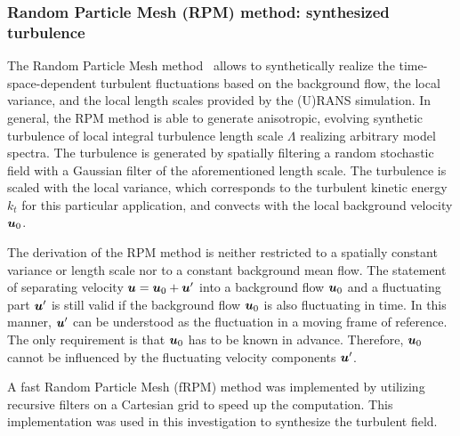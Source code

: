 \subsubsection{Random Particle Mesh (RPM) method: synthesized turbulence}
The Random Particle Mesh method~\cite{ewert_caa_2011} allows to synthetically realize the time-space-dependent turbulent fluctuations based on the background flow, the local variance, and the local length scales provided by the (U)RANS simulation. In general, the RPM method is able to generate anisotropic, evolving synthetic turbulence of local integral turbulence length scale $\Lambda$ 
realizing arbitrary model spectra. The turbulence is generated by spatially filtering a random stochastic field with a Gaussian filter of the aforementioned length scale. The turbulence is scaled with the local variance, which corresponds to the turbulent kinetic energy $k_t$ for this particular application, and convects with the local background velocity ${\boldsymbol{u}}_0$.

The derivation of the RPM method is neither restricted to a spatially constant variance or length scale nor to a constant background mean flow. The statement of separating velocity ${\boldsymbol{u}} = {\boldsymbol{u}}_0 + {\boldsymbol{u}}'$ into a background flow ${\boldsymbol{u}}_0$ and a fluctuating part ${\boldsymbol{u}}'$ is still valid if the background flow ${\boldsymbol{u}}_0$ is also fluctuating in time. In this manner, ${\boldsymbol{u}}'$ can be understood as the fluctuation in a moving frame of reference. The only requirement is that ${\boldsymbol{u}}_0$ has to be known in advance. Therefore, ${\boldsymbol{u}}_0$ cannot be influenced by the fluctuating velocity components ${\boldsymbol{u}}'$. 

A fast Random Particle Mesh (fRPM) method was implemented by \citet{siefert_sweeping_2009} utilizing recursive filters on a Cartesian grid to speed up the computation. This implementation was used in this investigation to synthesize the turbulent field.

